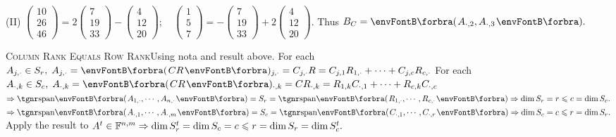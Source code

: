 (II) {\normalsize$\begin{pmatrix} 10\\[-2pt] 26\\[-2pt] 46\end{pmatrix}=2\begin{pmatrix} 7\\[-2pt] 19\\[-2pt] 33\end{pmatrix}-\begin{pmatrix} 4\\[-2pt] 12\\[-2pt] 20\end{pmatrix}; \quad \begin{pmatrix} 1\\[-2pt] 5\\[-2pt] 7\end{pmatrix}=-\begin{pmatrix} 7\\[-2pt] 19\\[-2pt] 33\end{pmatrix}+2\begin{pmatrix} 4\\[-2pt] 12\\[-2pt] 20\end{pmatrix}$}. \;Thus $B_C=\BigPar{A_{\cdot,2},A_{\cdot,3}}.$\vspace{6pt}\par
\SepLine

\BulletPointX\textsc{Column Rank Equals Row Rank}\quad Using nota and result above.\TextB{}
For each $A_{j,\cdot}\in S_r,\;A_{j,\cdot}=\BigPar{CR}{_{j,\cdot}}=C_{j,\cdot}R=C_{j,1}R_{1,\cdot}+\dots+C_{j,c}R_{c,\cdot}$\TextB{}
For each $A_{\cdot,k}\in S_c,\;A_{\cdot,k}=\BigPar{CR}{_{\cdot,k}}=CR_{\cdot,k}=R_{1,k}C_{\cdot,1}+\dots+R_{c,k}C_{\cdot,c}$\TextB{}
$\Rightarrow\Span[\BigPar]{A_{1,\cdot},\cdots,A_{n,\cdot}}=S_r=\Span[\BigPar]{R_{1,\cdot},\cdots,R_{c,\cdot}}\Rightarrow\dim S_r=r\leqslant c=\dim S_c.$\TextB{}
$\Rightarrow\Span[\BigPar]{A_{\cdot,1},\cdots,A_{\cdot,m}}=S_c=\Span[\BigPar]{C_{\cdot,1},\cdots,C_{\cdot,r}}\Rightarrow\dim S_c=c\leqslant r=\dim S_r.$\TextB{}
\Or Apply the result to $A^t\in{\mathbb{F}}^{n,m}\Rightarrow\dim S_r^t=\dim S_c=c\leqslant r=\dim S_r=\dim S_c^t.$\PfEnd
\SepLine

\def\rank{{\textup{\tgnr rank}}\,}

